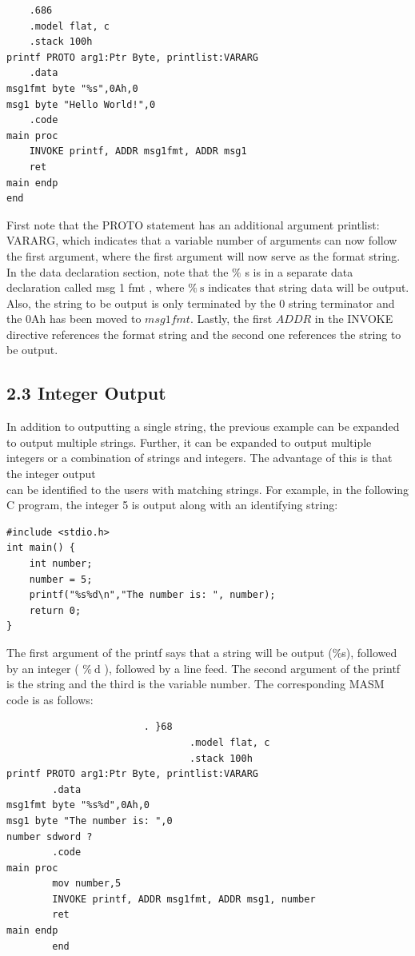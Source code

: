 \documentclass[10pt]{book}
\begin{document}
\begin{verbatim}
    .686
    .model flat, c
    .stack 100h
printf PROTO arg1:Ptr Byte, printlist:VARARG
    .data
msg1fmt byte "%s",0Ah,0
msg1 byte "Hello World!",0
    .code
main proc
    INVOKE printf, ADDR msg1fmt, ADDR msg1
    ret
main endp
end
\end{verbatim}

First note that the PROTO statement has an additional argument printlist: VARARG, which indicates that a variable number of arguments can now follow the first argument, where the first argument will now serve as the format string. In the data declaration section, note that the $\%$ s is in a separate data declaration called msg 1 fmt , where $\% \mathrm{~s}$ indicates that string data will be output. Also, the string to be output is only terminated by the 0 string terminator and the 0Ah has been moved to $m s g 1 f m t$. Lastly, the first $A D D R$ in the INVOKE directive references the format string and the second one references the string to be output.

\subsection*{2.3 Integer Output}
In addition to outputting a single string, the previous example can be expanded to output multiple strings. Further, it can be expanded to output multiple integers or a combination of strings and integers. The advantage of this is that the integer output\\
can be identified to the users with matching strings. For example, in the following C program, the integer 5 is output along with an identifying string:


\begin{verbatim}
#include <stdio.h>
int main() {
    int number;
    number = 5;
    printf("%s%d\n","The number is: ", number);
    return 0;
}
\end{verbatim}

The first argument of the printf says that a string will be output (\%s), followed by an integer ( $\% \mathrm{~d}$ ), followed by a line feed. The second argument of the printf is the string and the third is the variable number. The corresponding MASM code is as follows:

\begin{verbatim}
                        . }68
                                .model flat, c
                                .stack 100h
printf PROTO arg1:Ptr Byte, printlist:VARARG
        .data
msg1fmt byte "%s%d",0Ah,0
msg1 byte "The number is: ",0
number sdword ?
        .code
main proc
        mov number,5
        INVOKE printf, ADDR msg1fmt, ADDR msg1, number
        ret
main endp
        end
\end{verbatim}
\end{document}
